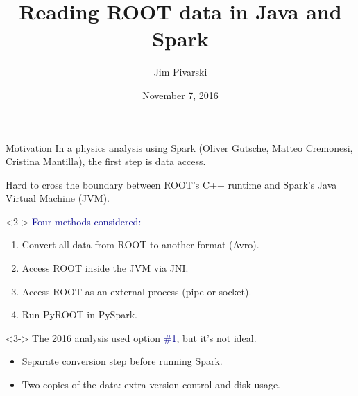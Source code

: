 \documentclass{beamer}
\title[2016-11-07-rootteam-root4j]{Reading ROOT data in Java and Spark}
\author{Jim Pivarski}
\institute{Princeton -- DIANA}
\date{November 7, 2016}
\begin{document}

\begin{frame}
  \titlepage
\end{frame}



\begin{frame}{Motivation}
\vspace{0.25 cm}
In a physics analysis using Spark {\small (Oliver Gutsche, Matteo Cremonesi, Cristina Mantilla)}, the first step is data access.

\vspace{0.25 cm}
Hard to cross the boundary between ROOT's C++ runtime and Spark's Java Virtual Machine (JVM).

\vspace{0.25 cm}
\begin{uncoverenv}<2->
\textcolor{darkblue}{Four methods considered:}
\begin{enumerate}
\item Convert all data from ROOT to another format (Avro).
\item Access ROOT inside the JVM via JNI.
\item Access ROOT as an external process (pipe or socket).
\item Run PyROOT in PySpark.
\end{enumerate}
\end{uncoverenv}

\vspace{0.25 cm}
\begin{uncoverenv}<3->
The 2016 analysis used option \textcolor{darkblue}{\#1}, but it's not ideal.
\begin{itemize}
\item Separate conversion step before running Spark.
\item Two copies of the data: extra version control and disk usage.
\end{itemize}
\end{uncoverenv}
\end{frame}
\end{document}
